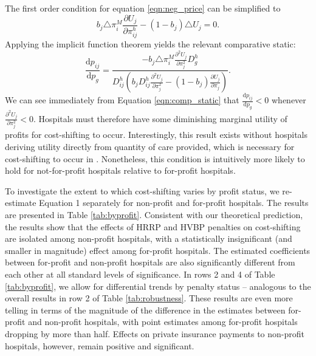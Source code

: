 \documentclass[12pt]{article}
\newcommand{\deriv}[2]{\frac{\mathrm{d}#1}{\mathrm{d}#2}}
\newcommand{\pderiv}[2]{\frac{\partial#1}{\partial#2}}
\begin{document}
The first order condition for equation \ref{eqn:neg_price} can be simplified to
\begin{equation}
 b_{j} \triangle \pi_{i}^{M} \pderiv{U_{j}}{\pi_{ij}^{h}} - (1-b_{j}) \triangle U_{j} = 0.
\label{eqn:price_foc}
\end{equation}
Applying the implicit function theorem yields the relevant comparative static:
\begin{equation}
\deriv{p_{ij}}{p_{g}} = \frac{- b_{j} \triangle \pi_{i}^{M} \pderiv{^{2}U_{j}}{\pi_{j}^{2}}D_{g}^{h}}{D_{ij}^{h}\left(b_{j} D_{ij}^{h} \pderiv{^{2}U_{j}}{\pi_{j}^{2}} - (1-b_{j}) \pderiv{U_{j}}{\pi_{j}} \right)}.
\label{eqn:comp_static}
\end{equation}
We can see immediately from Equation \ref{eqn:comp_static} that $\deriv{p_{ij}}{p_{g}}<0$ whenever $\pderiv{^{2}U_{j}}{\pi_{j}^{2}}<0$. Hospitals must therefore have some diminishing marginal utility of profits for cost-shifting to occur. Interestingly, this result exists without hospitals deriving utility directly from quantity of care provided, which is necessary for cost-shifting to occur in \cite{dranove1988}. Nonetheless, this condition is intuitively more likely to hold for not-for-profit hospitals relative to for-profit hospitals.

To investigate the extent to which cost-shifting varies by profit status, we re-estimate Equation 1 separately for non-profit and for-profit hospitals.  The results are presented in Table \ref{tab:byprofit}.  Consistent with our theoretical prediction, the results show that the effects of HRRP and HVBP penalties on cost-shifting are isolated among non-profit hospitals, with a statistically insignificant (and smaller in magnitude) effect among for-profit hospitals. The estimated coefficients between for-profit and non-profit hospitals are also significantly different from each other at all standard levels of significance. In rows 2 and 4 of Table \ref{tab:byprofit}, we allow for differential trends by penalty status -- analogous to the overall results in row 2 of Table \ref{tab:robustness}. These results are even more telling in terms of the magnitude of the difference in the estimates between for-profit and non-profit hospitals, with point estimates among for-profit hospitals dropping by more than half. Effects on private insurance payments to non-profit hospitals, however, remain positive and significant.
\end{document}
